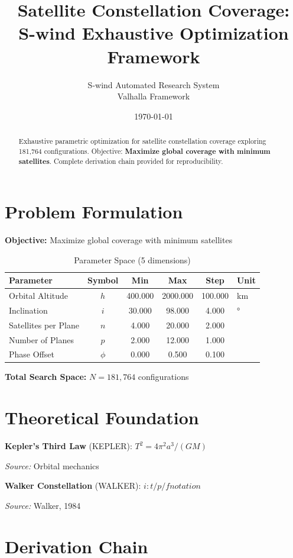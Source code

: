 \documentclass[11pt,twocolumn]{article}
\title{Satellite Constellation Coverage: \\S-wind Exhaustive Optimization Framework}
\author{S-wind Automated Research System\\Valhalla Framework}
\date{\today}
\begin{document}
\maketitle

\begin{abstract}
Exhaustive parametric optimization for satellite constellation coverage exploring 181,764 configurations.
Objective: \textbf{Maximize global coverage with minimum satellites}.
Complete derivation chain provided for reproducibility.
\end{abstract}

\section{Problem Formulation}
\textbf{Objective:} Maximize global coverage with minimum satellites

\begin{table}[h]
\centering
\caption{Parameter Space (5 dimensions)}
\begin{tabular}{@{}lccccl@{}}
\toprule
Parameter & Symbol & Min & Max & Step & Unit \\
\midrule
Orbital Altitude & $h$ & 400.000 & 2000.000 & 100.000 & km \\
Inclination & $i$ & 30.000 & 98.000 & 4.000 & ° \\
Satellites per Plane & $n$ & 4.000 & 20.000 & 2.000 &  \\
Number of Planes & $p$ & 2.000 & 12.000 & 1.000 &  \\
Phase Offset & $\phi$ & 0.000 & 0.500 & 0.100 &  \\
\bottomrule
\end{tabular}
\end{table}

\textbf{Total Search Space:} $N = 181,764$ configurations

\section{Theoretical Foundation}
\textbf{Kepler's Third Law} (KEPLER): $T^2 = 4\pi^2 a^3/(GM)$

\textit{Source:} Orbital mechanics

\textbf{Walker Constellation} (WALKER): $i:t/p/f notation$

\textit{Source:} Walker, 1984


\section{Derivation Chain}
\end{document}
